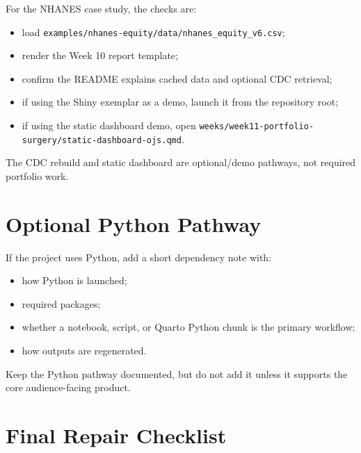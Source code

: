 \documentclass[
  letterpaper,
  DIV=11,
  numbers=noendperiod,
  oneside]{scrreprt}
\providecommand{\tightlist}{%
  \setlength{\itemsep}{0pt}\setlength{\parskip}{0pt}}
\begin{document}

For the NHANES case study, the checks are:

\begin{itemize}
\tightlist
\item
  load \texttt{examples/nhanes-equity/data/nhanes\_equity\_v6.csv};
\item
  render the Week 10 report template;
\item
  confirm the README explains cached data and optional CDC retrieval;
\item
  if using the Shiny exemplar as a demo, launch it from the repository
  root;
\item
  if using the static dashboard demo, open
  \texttt{weeks/week11-portfolio-surgery/static-dashboard-ojs.qmd}.
\end{itemize}

The CDC rebuild and static dashboard are optional/demo pathways, not
required portfolio work.

\section*{Optional Python Pathway}\label{optional-python-pathway}


If the project uses Python, add a short dependency note with:

\begin{itemize}
\tightlist
\item
  how Python is launched;
\item
  required packages;
\item
  whether a notebook, script, or Quarto Python chunk is the primary
  workflow;
\item
  how outputs are regenerated.
\end{itemize}

Keep the Python pathway documented, but do not add it unless it supports
the core audience-facing product.

\section*{Final Repair Checklist}\label{final-repair-checklist}

\end{document}
